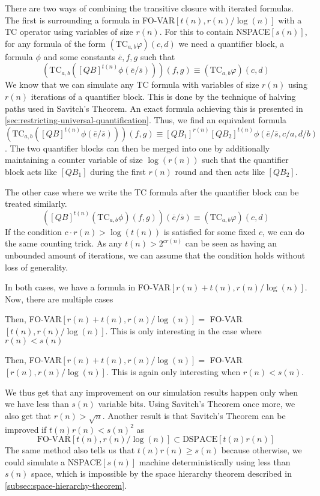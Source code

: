 There are two ways of combining the transitive closure with iterated formulas.
The first is surrounding a formula in FO-VAR$[t(n), r(n)/\log(n)]$ with a TC operator using variables of size $r(n)$.
For this to contain NSPACE$[s(n)]$, for any formula of the form $(\text{TC}_{a, b}\varphi)(c, d)$ we need a quantifier block, a formula $\phi$ and some constants $\overline{e}, f, g$ such that
\[
    \left(\text{TC}_{a, b}\left([QB]^{t(n)}\phi(\overline{e}/\overline{s})\right)\right)(f, g) \equiv (\text{TC}_{a, b}\varphi)(c, d)
\]
We know that we can simulate any TC formula with variables of size $r(n)$ using $r(n)$ iterations of a quantifier block.
This is done by the technique of halving paths used in Savitch's Theorem.
An exact formula achieving this is presented in \cref{sec:restricting-universal-quantification}.
Thus, we find an equivalent formula
\[
    \left(\text{TC}_{a, b}\left([QB]^{t(n)}\phi(\overline{e}/\overline{s})\right)\right)(f, g) \equiv [QB_1]^{r(n)}[QB_2]^{t(n)}\phi(\overline{e}/\overline{s}, c/a, d/b)
\].
The two quantifier blocks can then be merged into one by additionally maintaining a counter variable of size $\log(r(n))$ such that the quantifier block acts like $[QB_1]$ during the first $r(n)$ round and then acts like $[QB_2]$.

The other case where we write the TC formula after the quantifier block can be treated similarly.
\[
    \left([QB]^{t(n)}\left(\text{TC}_{a, b}\phi\right)(f, g)\right)(\overline{e}/\overline{s}) \equiv (\text{TC}_{a, b}\varphi)(c, d)
\]
If the condition $c \cdot r(n) > \log(t(n))$ is satisfied for some fixed $c$, we can do the same counting trick.
As any $t(n) > 2^{cr(n)}$ can be seen as having an unbounded amount of iterations, we can assume that the condition holds without loss of generality.

In both cases, we have a formula in FO-VAR$[r(n) + t(n), r(n)/\log(n)]$.
Now, there are multiple cases
\begin{description}
    \setlength\itemsep{0.2em}
    \item[$r(n) \leq t(n)$]  Then, FO-VAR$[r(n) + t(n), r(n)/\log(n)] =$ FO-VAR$[t(n), r(n)/\log(n)]$.
    This is only interesting in the case where $r(n) < s(n)$
    \item[$r(n) > t(n)$] Then, FO-VAR$[r(n) + t(n), r(n)/\log(n)] =$ FO-VAR$[r(n), r(n)/\log(n)]$.
    This is again only interesting when $r(n) < s(n)$.
\end{description}

We thus get that any improvement on our simulation results happen only when we have less than $s(n)$ variable bits.
Using Savitch's Theorem once more, we also get that $r(n) > \sqrt{n}$.
Another result is that Savitch's Theorem can be improved if $t(n)r(n) < s(n)^2$ as
\[
    \text{FO-VAR}[t(n), r(n)/\log(n)] \subset \text{DSPACE}[t(n)r(n)]
\]
The same method also tells us that $t(n)r(n) \geq s(n)$ because otherwise, we could simulate a NSPACE$[s(n)]$ machine deterministically using less than $s(n)$ space, which is impossible by the space hierarchy theorem described in \cref{subsec:space-hierarchy-theorem}.
